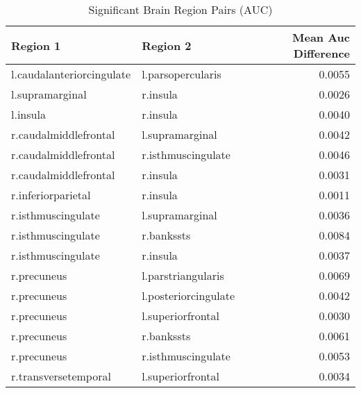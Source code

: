 \begin{table}
\caption{Significant Brain Region Pairs (AUC)}
\label{tab:significant_auc}
\begin{tabular}{llr}
\toprule
Region 1 & Region 2 & Mean Auc Difference \\
\midrule
l.caudalanteriorcingulate & l.parsopercularis & 0.0055 \\
l.supramarginal & r.insula & 0.0026 \\
l.insula & r.insula & 0.0040 \\
r.caudalmiddlefrontal & l.supramarginal & 0.0042 \\
r.caudalmiddlefrontal & r.isthmuscingulate & 0.0046 \\
r.caudalmiddlefrontal & r.insula & 0.0031 \\
r.inferiorparietal & r.insula & 0.0011 \\
r.isthmuscingulate & l.supramarginal & 0.0036 \\
r.isthmuscingulate & r.bankssts & 0.0084 \\
r.isthmuscingulate & r.insula & 0.0037 \\
r.precuneus & l.parstriangularis & 0.0069 \\
r.precuneus & l.posteriorcingulate & 0.0042 \\
r.precuneus & l.superiorfrontal & 0.0030 \\
r.precuneus & r.bankssts & 0.0061 \\
r.precuneus & r.isthmuscingulate & 0.0053 \\
r.transversetemporal & l.superiorfrontal & 0.0034 \\
\bottomrule
\end{tabular}
\end{table}
